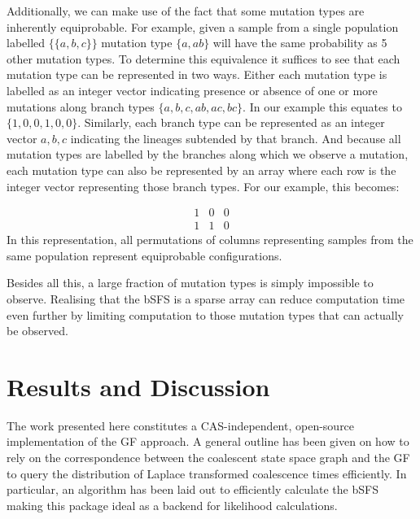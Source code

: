 \documentclass[10pt, a4]{article}
\begin{document}
Additionally, we can make use of the fact that some mutation types are inherently equiprobable. For example, given a sample from a single population labelled $\{\{a, b, c\}\}$ mutation type $\{a, ab\}$ will have the same probability as 5 other mutation types. To determine this equivalence it suffices to see that each mutation type can be represented in two ways. Either each mutation type is labelled as an integer vector indicating presence or absence of one or more mutations along branch types $\{a, b, c, ab, ac, bc\}$. In our example this equates to $\{1, 0, 0,1, 0, 0\}$. Similarly, each branch type can be represented as an integer vector ${a, b, c}$ indicating the lineages subtended by that branch. And because all mutation types are labelled by the branches along which we observe a mutation, each mutation type can also be represented by an array where each row is the integer vector representing those branch types. For our example, this becomes:

\begin{equation*} 
\begin{matrix}
	1 & 0 & 0 \\
	1 & 1 & 0
\end{matrix}
\end{equation*}
In this representation, all permutations of columns representing samples from the same population represent equiprobable configurations.

Besides all this, a large fraction of mutation types is simply impossible to observe. Realising that the bSFS is a sparse array can reduce computation time even further by limiting computation to those mutation types that can actually be observed.

\section{Results and Discussion}

The work presented here constitutes a CAS-independent, open-source implementation of the GF approach. A general outline has been given on how to rely on the correspondence between the coalescent state space graph and the GF to query the distribution of Laplace transformed coalescence times efficiently. In particular, an algorithm has been laid out to efficiently calculate the bSFS making this package ideal as a backend for likelihood calculations.
\end{document}
